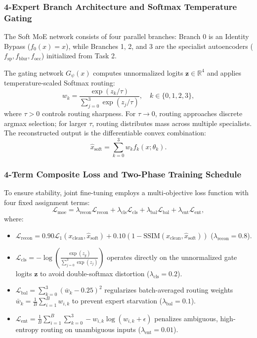\documentclass[conference]{IEEEtran}
\begin{document}
\subsubsection{4-Expert Branch Architecture and Softmax Temperature Gating}
The Soft MoE network consists of four parallel branches: Branch 0 is an Identity Bypass ($f_0(x) = x$), while Branches 1, 2, and 3 are the specialist autoencoders ($f_{\text{sp}}, f_{\text{blur}}, f_{\text{occ}}$) initialized from Task 2.

The gating network $G_\psi(x)$ computes unnormalized logits $\mathbf{z} \in \mathbb{R}^4$ and applies temperature-scaled Softmax routing:
\begin{equation}
w_k = \frac{\exp(z_k / \tau)}{\sum_{j=0}^3 \exp(z_j / \tau)}, \quad k \in \{0, 1, 2, 3\},
\end{equation}
where $\tau > 0$ controls routing sharpness. For $\tau \to 0$, routing approaches discrete argmax selection; for larger $\tau$, routing distributes mass across multiple specialists. The reconstructed output is the differentiable convex combination:
\begin{equation}
\hat{x}_{\text{soft}} = \sum_{k=0}^3 w_k f_k(x; \theta_k).
\end{equation}

\subsubsection{4-Term Composite Loss and Two-Phase Training Schedule}
To ensure stability, joint fine-tuning employs a multi-objective loss function with four fixed assignment terms:
\begin{equation}
\mathcal{L}_{\text{moe}} = \lambda_{\text{recon}}\mathcal{L}_{\text{recon}} + \lambda_{\text{cls}}\mathcal{L}_{\text{cls}} + \lambda_{\text{bal}}\mathcal{L}_{\text{bal}} + \lambda_{\text{ent}}\mathcal{L}_{\text{ent}},
\end{equation}
where:
\begin{itemize}
    \item $\mathcal{L}_{\text{recon}} = 0.90\mathcal{L}_1(x_{\text{clean}}, \hat{x}_{\text{soft}}) + 0.10(1 - \text{SSIM}(x_{\text{clean}}, \hat{x}_{\text{soft}}))$ ($\lambda_{\text{recon}} = 0.8$).
    \item $\mathcal{L}_{\text{cls}} = -\log\left(\frac{\exp(z_{y})}{\sum_{j=0}^3 \exp(z_j)}\right)$ operates directly on the unnormalized gate logits $\mathbf{z}$ to avoid double-softmax distortion ($\lambda_{\text{cls}} = 0.2$).
    \item $\mathcal{L}_{\text{bal}} = \sum_{k=0}^3 (\bar{w}_k - 0.25)^2$ regularizes batch-averaged routing weights $\bar{w}_k = \frac{1}{B}\sum_{i=1}^B w_{i,k}$ to prevent expert starvation ($\lambda_{\text{bal}} = 0.1$).
    \item $\mathcal{L}_{\text{ent}} = \frac{1}{B}\sum_{i=1}^B \sum_{k=0}^3 -w_{i,k} \log(w_{i,k} + \epsilon)$ penalizes ambiguous, high-entropy routing on unambiguous inputs ($\lambda_{\text{ent}} = 0.01$).
\end{itemize}
\end{document}

